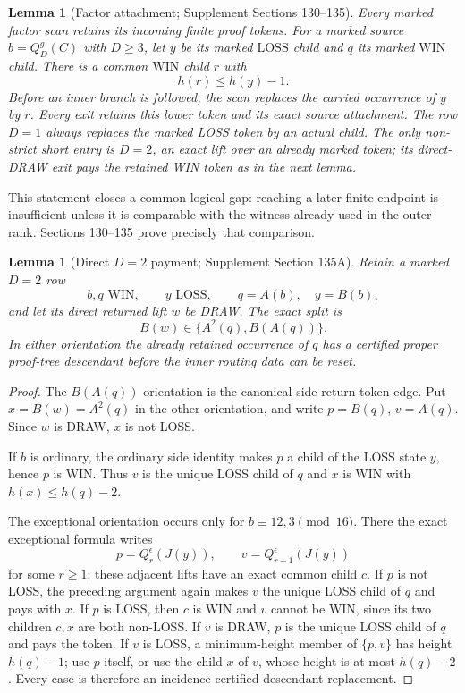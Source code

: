 \documentclass[11pt]{article}
\newtheorem{lemma}[theorem]{Lemma}
\newcommand{\WIN}{\mathrm{WIN}}
\newcommand{\LOSS}{\mathrm{LOSS}}
\begin{document}
\begin{lemma}[Factor attachment; Supplement Sections 130--135]
Every marked factor scan retains its incoming finite proof tokens. For a
marked source $b=Q_D^g(C)$ with $D\ge3$, let $y$ be its marked $\LOSS$ child
and $q$ its marked $\WIN$ child. There is a common $\WIN$ child $r$ with
\[
  h(r)\le h(y)-1.
\]
Before an inner branch is followed, the scan replaces the carried occurrence
of $y$ by $r$. Every exit retains this lower token and its exact source
attachment. The row $D=1$ always replaces the marked LOSS token by an actual
child. The only non-strict short entry is $D=2$, an exact lift over an already
marked token; its direct-DRAW exit pays the retained WIN token as in the next
lemma.
\end{lemma}

This statement closes a common logical gap: reaching a later finite endpoint
is insufficient unless it is comparable with the witness already used in the
outer rank. Sections 130--135 prove precisely that comparison.

\begin{lemma}[Direct $D=2$ payment; Supplement Section 135A]
Retain a marked $D=2$ row
\[
 b,q\text{ WIN},\qquad y\text{ LOSS},\qquad q=A(b),\quad y=B(b),
\]
and let its direct returned lift $w$ be DRAW.  The exact split is
\[
 B(w)\in\{A^2(q),B(A(q))\}.
\]
In either orientation the already retained occurrence of $q$ has a
certified proper proof-tree descendant before the inner routing data can be
reset.
\end{lemma}

\begin{proof}
The $B(A(q))$ orientation is the canonical side-return token edge.  Put
$x=B(w)=A^2(q)$ in the other orientation, and write
$p=B(q)$, $v=A(q)$. Since $w$ is DRAW, $x$ is not LOSS.

If $b$ is ordinary, the ordinary side identity makes $p$ a child of the
LOSS state $y$, hence $p$ is WIN. Thus $v$ is the unique LOSS child of $q$
and $x$ is WIN with $h(x)\le h(q)-2$.

The exceptional orientation occurs only for $b\equiv12,3\pmod {16}$.
There the exact exceptional formula writes
\[
 p=Q_r^\epsilon(J(y)),\qquad
 v=Q_{r+1}^\epsilon(J(y))
\]
for some $r\ge1$; these adjacent lifts have an exact common child $c$.
If $p$ is not LOSS, the preceding argument again makes $v$ the unique LOSS
child of $q$ and pays with $x$. If $p$ is LOSS, then $c$ is WIN and $v$
cannot be WIN, since its two children $c,x$ are both non-LOSS. If $v$ is
DRAW, $p$ is the unique LOSS child of $q$ and pays the token. If $v$ is
LOSS, a minimum-height member of $\{p,v\}$ has height $h(q)-1$; use $p$
itself, or use the child $x$ of $v$, whose height is at most $h(q)-2$.
Every case is therefore an incidence-certified descendant replacement.
\end{proof}
\end{document}
